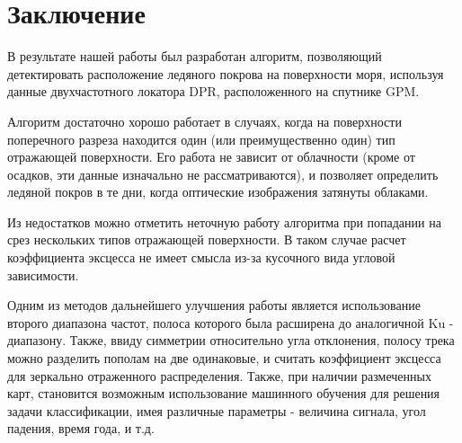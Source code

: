 \section{Заключение}

В результате нашей работы был разработан алгоритм, позволяющий детектировать расположение ледяного покрова на
поверхности моря, используя данные двухчастотного локатора DPR, расположенного на спутнике GPM. 

Алгоритм достаточно хорошо работает в случаях, когда на поверхности поперечного разреза находится один (или
преимущественно один) тип отражающей поверхности. Его работа не зависит от облачности (кроме от осадков, эти данные изначально не
рассматриваются), и позволяет определить ледяной покров в те дни, когда оптические изображения затянуты облаками. 

Из недостатков можно отметить неточную работу алгоритма при попадании на срез нескольких типов отражающей поверхности. В
таком случае расчет коэффициента эксцесса не имеет смысла из-за кусочного вида угловой зависимости. 

Одним из методов дальнейшего улучшения работы является использование второго диапазона частот, полоса которого была
расширена до аналогичной Ku - диапазону. Также, ввиду симметрии относительно угла отклонения, полосу трека можно
разделить пополам на две одинаковые, и считать коэффициент эксцесса для зеркально отраженного распределения. Также, при
наличии размеченных карт, становится возможным использование машинного обучения для решения задачи классификации, имея
различные параметры - величина сигнала, угол падения, время года, и т.д. 


